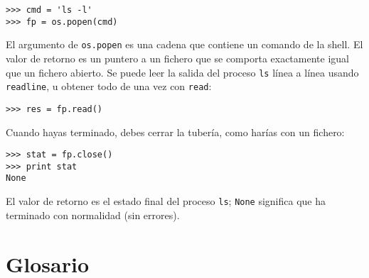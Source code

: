 
\beforeverb
\begin{verbatim}
>>> cmd = 'ls -l'
>>> fp = os.popen(cmd)
\end{verbatim}
\afterverb
%
El argumento de {\tt os.popen} es una cadena que contiene un comando de la shell. El
valor de retorno es un puntero a un fichero que se comporta exactamente igual que un fichero
abierto. Se puede leer la salida del proceso {\tt ls} línea a línea
usando {\tt readline}, u obtener todo de una vez
con {\tt read}:


\beforeverb
\begin{verbatim}
>>> res = fp.read()
\end{verbatim}
\afterverb
%
Cuando hayas terminado, debes cerrar la tubería, como harías con un fichero:


\beforeverb
\begin{verbatim}
>>> stat = fp.close()
>>> print stat
None
\end{verbatim}
\afterverb
%
El valor de retorno es el estado final del proceso {\tt ls};
{\tt None} significa que ha terminado con normalidad (sin errores).

\section{Glosario}

